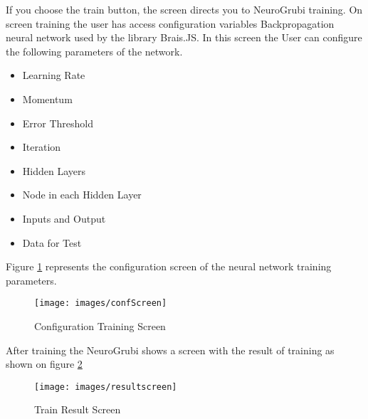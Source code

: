 If you choose the train button, the screen directs you to NeuroGrubi training. 
On screen training the user has access configuration variables Backpropagation 
neural network used by the library Brais.JS. In this screen the User can 
configure the following parameters of the network.

\begin{itemize}
 \item Learning Rate
 \item Momentum
 \item Error Threshold
 \item Iteration
 \item Hidden Layers
 \item Node in each Hidden Layer
 \item Inputs and Output 
 \item Data for Test
\end{itemize}

Figure \ref{fig:4}  represents the configuration screen of the neural 
network training parameters.

\begin{figure}[!htbp]
  \begin{center}
    \texttt{[image: images/confScreen]}
    \caption{Configuration Training Screen}
    \label{fig:4}
  \end{center}
\end{figure}

After training the NeuroGrubi shows a screen with the result of training as 
shown on figure \ref{fig:5}

\begin{figure}[!htbp]
  \begin{center}
    \texttt{[image: images/resultscreen]}
    \caption{Train Result Screen}
    \label{fig:5}
  \end{center}
\end{figure}
